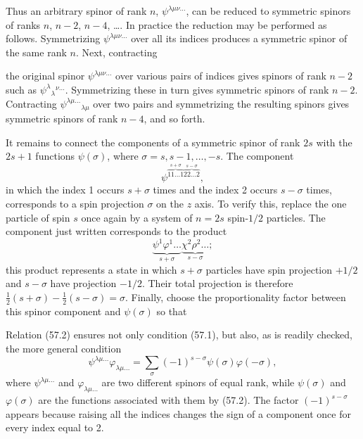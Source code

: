 Thus an arbitrary spinor of rank $n$, $\psi^{\lambda\mu\nu\ldots}$, can be
reduced to symmetric spinors of ranks $n$, $n-2$, $n-4$, \ldots. In practice
the reduction may be performed as follows. Symmetrizing
$\psi^{\lambda\mu\nu\ldots}$ over all its indices produces a symmetric
spinor of the same rank $n$. Next, contracting

the original spinor $\psi^{\lambda\mu\nu\ldots}$ over various pairs of
indices gives spinors of rank $n-2$ such as
$\psi^\lambda{}_{\lambda}{}^{\nu\ldots}$. Symmetrizing these in turn gives
symmetric spinors of rank $n-2$. Contracting
$\psi^{\lambda\mu\ldots}{}_{\lambda\mu}$ over two pairs and symmetrizing the
resulting spinors gives symmetric spinors of rank $n-4$, and so forth.

It remains to connect the components of a symmetric spinor of rank $2s$ with
the $2s+1$ functions $\psi(\sigma)$, where
$\sigma=s,s-1,\ldots,-s$. The component
\[
 \psi^{\overbrace{11\ldots1}^{s+\sigma}
              \overbrace{22\ldots2}^{s-\sigma}},
\]
in which the index 1 occurs $s+\sigma$ times and the index 2 occurs
$s-\sigma$ times, corresponds to a spin projection $\sigma$ on the $z$ axis.
To verify this, replace the one particle of spin $s$ once again by a system of
$n=2s$ spin-$1/2$ particles. The component just written corresponds to the
product
\[
 \underbrace{\psi^1\varphi^1\ldots}_{s+\sigma}
 \underbrace{\chi^2\rho^2\ldots}_{s-\sigma};
\]
this product represents a state in which $s+\sigma$ particles have spin
projection $+1/2$ and $s-\sigma$ have projection $-1/2$. Their total
projection is therefore
$\frac12(s+\sigma)-\frac12(s-\sigma)=\sigma$. Finally, choose the
proportionality factor between this spinor component and $\psi(\sigma)$ so
that


Relation (57.2) ensures not only condition (57.1), but also, as is readily
checked, the more general condition
\begin{equation}
 \psi^{\lambda\mu\ldots}\varphi_{\lambda\mu\ldots}
 =\sum_\sigma(-1)^{s-\sigma}\psi(\sigma)\varphi(-\sigma),
 \tag{57.3}
\end{equation}
where $\psi^{\lambda\mu\ldots}$ and $\varphi_{\lambda\mu\ldots}$ are two
different spinors of equal rank, while $\psi(\sigma)$ and $\varphi(\sigma)$
are the functions associated with them by (57.2). The factor
$(-1)^{s-\sigma}$ appears because raising all the indices changes the sign of
a component once for every index equal to 2.

